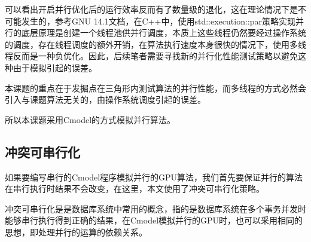 可以看出开启并行优化后的运行效率反而有了数量级的退化，这在理论情况下是不可能发生的，参考GNU 14.1文档，在C++中，使用std::execution::par策略实现并行的底层原理是创建一个线程池供并行调度\cite{GNUdoc}，本质上这些线程仍然要经过操作系统的调度，存在线程调度的额外开销，在算法执行速度本身很快的情况下，使用多线程反而是一种负优化。因此，后续笔者需要寻找新的并行化性能测试策略以避免这种由于模拟引起的误差。

本课题的重点在于发掘点在三角形内测试算法的并行性能，而多线程的方式必然会引入与课题算法无关的，由操作系统调度引起的误差。

所以本课题采用Cmodel的方式模拟并行算法。

\subsection{冲突可串行化}
如果要编写串行的Cmodel程序模拟并行的GPU算法，我们首先要保证并行的算法在串行执行时结果不会改变，在这里，本文使用了冲突可串行化策略。

冲突可串行化是是数据库系统中常用的概念，指的是数据库系统在多个事务并发时能够串行执行得到正确的结果，在Cmodel模拟并行的GPU时，也可以采用相同的思想，即处理并行的运算的依赖关系。

